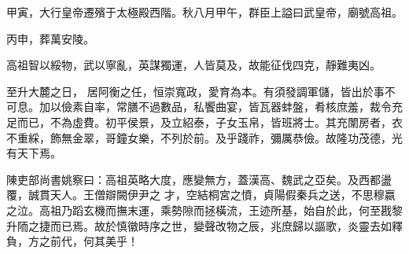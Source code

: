 \begin{pinyinscope}
 甲寅，大行皇帝遷殯于太極殿西階。秋八月甲午，群臣上謚曰武皇帝，廟號高祖。



 丙申，葬萬安陵。



 高祖智以綏物，武以寧亂，英謀獨運，人皆莫及，故能征伐四克，靜難夷凶。



 至升大麓之日，
 居阿衡之任，恒崇寬政，愛育為本。有須發調軍儲，皆出於事不可息。加以儉素自率，常膳不過數品，私饗曲宴，皆瓦器蚌盤，肴核庶羞，裁令充足而已，不為虛費。初平侯景，及立紹泰，子女玉帛，皆班將士。其充闈房者，衣不重綵，飾無金翠，哥鐘女樂，不列於前。及乎踐祚，彌厲恭儉。故隆功茂德，光有天下焉。



 陳吏部尚書姚察曰：高祖英略大度，應變無方，蓋漢高、魏武之亞矣。及西都盪覆，誠貫天人。王僧辯闕伊尹之
 才，空結桐宮之憤，貞陽假秦兵之送，不思穆嬴之泣。高祖乃蹈玄機而撫末運，乘勢隙而拯橫流，王迹所基，始自於此，何至戡黎升陑之捷而已焉。故於慎徽時序之世，變聲改物之辰，兆庶歸以謳歌，炎靈去如釋負，方之前代，何其美乎！



\end{pinyinscope}